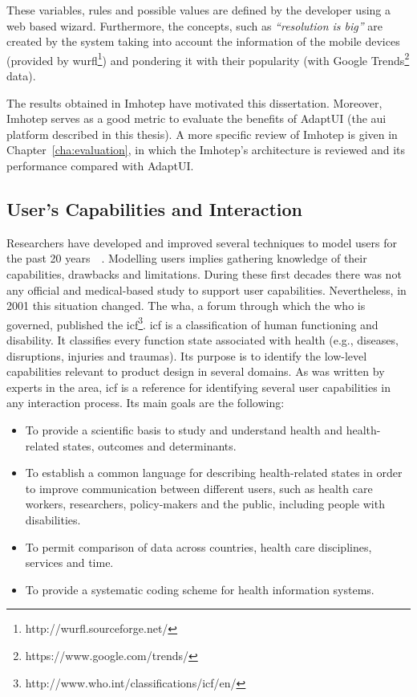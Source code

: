 \inputminted[linenos=true, fontsize=\footnotesize, frame=lines]{java}{5_experiments_and_results/imhotep_pseudocode.txt}

These variables, rules and possible values are defined by the developer using a
web based wizard. Furthermore, the concepts, such as \textit{``resolution is 
big''} are created by the system taking into account the information of the mobile
devices (provided by \ac{wurfl}\footnote{http://wurfl.sourceforge.net/}) and pondering it with their 
popularity (with Google Trends\footnote{https://www.google.com/trends/} data).

The results obtained in Imhotep have motivated this dissertation. Moreover, Imhotep
serves as a good metric to evaluate the benefits of AdaptUI (the \ac{aui} platform 
described in this thesis). A more specific review of Imhotep is given in 
Chapter~\ref{cha:evaluation}, in which the Imhotep's architecture is reviewed 
and its performance compared with AdaptUI.


\subsection{User's Capabilities and Interaction}
\label{sec:background_icf}

Researchers have developed and improved several techniques to model users for 
the past 20 years~\citep{petrelli_user_centered_1999}~\citep{fink_adaptable_1997}. 
Modelling users implies gathering knowledge of their capabilities, drawbacks 
and limitations. During these first decades there was not any official and 
medical-based study to support user capabilities. Nevertheless, in 2001 
this situation changed. The \ac{wha}, a forum through which the \ac{who} is
governed, published the \ac{icf}\footnote{http://www.who.int/classifications/icf/en/}. 
\ac{icf} is a classification of human functioning and disability. It 
classifies every function state associated with health (e.g., diseases, 
disruptions, injuries and traumas). Its purpose is to identify the low-level 
capabilities relevant to product design in several domains. As was written by 
experts in the area, \ac{icf} is a reference for identifying several user 
capabilities in any interaction process. Its main goals are the following:

\begin{itemize}
  \item To provide a scientific basis to study and understand health and
  health-related states, outcomes and determinants.
  \item To establish a common language for describing health-related states in 
  order to improve communication between different users, such as health care 
  workers, researchers, policy-makers and the public, including people with 
  disabilities.
  \item To permit comparison of data across countries, health care disciplines,
  services and time.
  \item To provide a systematic coding scheme for health information systems.
\end{itemize}

